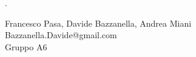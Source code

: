 \begin{center}

     	{\huge .}
	\vspace{0.5cm}

      	{\large Francesco Pasa, Davide Bazzanella, Andrea Miani} \\
      	{Bazzanella.Davide@gmail.com} \\
		{\large Gruppo A6} \\
	
	\vspace{0.3cm}
      	{\large }

\end{center}
